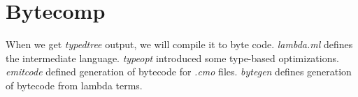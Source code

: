 
\section{Bytecomp}

When we get \textit{typedtree} output, we will compile it to byte
code.  \textit{lambda.ml} defines the intermediate
language. \textit{typeopt} introduced some type-based optimizations.
\textit{emitcode} defined generation of bytecode for \textit{.cmo}
files.  \textit{bytegen} defines generation of bytecode from lambda
terms.
